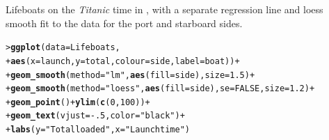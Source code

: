 \documentclass[10pt,krantz2]{krantz}\usepackage[]{graphicx}\usepackage[]{color}
\makeatletter
\newcommand{\hlnum}[1]{\textcolor[rgb]{0.686,0.059,0.569}{#1}}%
\newcommand{\hlstr}[1]{\textcolor[rgb]{0.192,0.494,0.8}{#1}}%
\newcommand{\hlopt}[1]{\textcolor[rgb]{0,0,0}{#1}}%
\newcommand{\hlstd}[1]{\textcolor[rgb]{0.345,0.345,0.345}{#1}}%
\newcommand{\hlkwc}[1]{\textcolor[rgb]{0.333,0.667,0.333}{#1}}%
\newcommand{\hlkwd}[1]{\textcolor[rgb]{0.737,0.353,0.396}{\textbf{#1}}}%
\newenvironment{kframe}{%
 \def\at@end@of@kframe{}%
 \ifinner\ifhmode%
  \def\at@end@of@kframe{\end{minipage}}%
  \begin{minipage}{\columnwidth}%
 \fi\fi%
 \def\FrameCommand##1{\hskip\@totalleftmargin \hskip-\fboxsep
 \colorbox{shadecolor}{##1}\hskip-\fboxsep
     \hskip-\linewidth \hskip-\@totalleftmargin \hskip\columnwidth}%
 \MakeFramed {\advance\hsize-\width
   \@totalleftmargin\z@ \linewidth\hsize
   \@setminipage}}%
 {\par\unskip\endMakeFramed%
 \at@end@of@kframe}
\newenvironment{knitrout}{}{} %
\renewenvironment{knitrout}{\small\renewcommand{\baselinestretch}{.85}}{} %
\makeatother
\begin{document}
\begin{Example}[lifeboat1]{Lifeboats on the \emph{Titanic}}
                                                                                                                                                                                                                                                                                                                                                                                                                                                                                                                                                                                                                                                                                                                                                                                                                                                                                                                                                                                                                                                                                                                                                                                                               time in ,
with a separate regression line and loess smooth
fit to the data for the port and starboard
sides.

\begin{knitrout}
\color{fgcolor}\begin{kframe}
\begin{alltt}
\hlstd{> }\hlkwd{ggplot}\hlstd{(}\hlkwc{data} \hlstd{= Lifeboats,}
\hlstd{+ }       \hlkwd{aes}\hlstd{(}\hlkwc{x}\hlstd{=launch,} \hlkwc{y}\hlstd{=total,} \hlkwc{colour}\hlstd{=side,}  \hlkwc{label}\hlstd{=boat))} \hlopt{+}
\hlstd{+ }     \hlkwd{geom_smooth}\hlstd{(}\hlkwc{method}\hlstd{=}\hlstr{"lm"}\hlstd{,} \hlkwd{aes}\hlstd{(}\hlkwc{fill}\hlstd{=side),} \hlkwc{size}\hlstd{=}\hlnum{1.5}\hlstd{)} \hlopt{+}
\hlstd{+ }     \hlkwd{geom_smooth}\hlstd{(}\hlkwc{method}\hlstd{=}\hlstr{"loess"}\hlstd{,} \hlkwd{aes}\hlstd{(}\hlkwc{fill}\hlstd{=side),} \hlkwc{se}\hlstd{=}\hlnum{FALSE}\hlstd{,} \hlkwc{size}\hlstd{=}\hlnum{1.2}\hlstd{)} \hlopt{+}
\hlstd{+ }     \hlkwd{geom_point}\hlstd{()} \hlopt{+} \hlkwd{ylim}\hlstd{(}\hlkwd{c}\hlstd{(}\hlnum{0}\hlstd{,}\hlnum{100}\hlstd{))} \hlopt{+}
\hlstd{+ }     \hlkwd{geom_text}\hlstd{(}\hlkwc{vjust}\hlstd{=}\hlopt{-}\hlnum{.5}\hlstd{,} \hlkwc{color}\hlstd{=}\hlstr{"black"}\hlstd{)} \hlopt{+}
\hlstd{+ }     \hlkwd{labs}\hlstd{(}\hlkwc{y}\hlstd{=}\hlstr{"Total loaded"}\hlstd{,} \hlkwc{x}\hlstd{=}\hlstr{"Launch time"}\hlstd{)}
\end{alltt}
\end{kframe}\begin{figure}[!htbp]


\end{figure}
\end{knitrout}
\end{Example}
\end{document}
